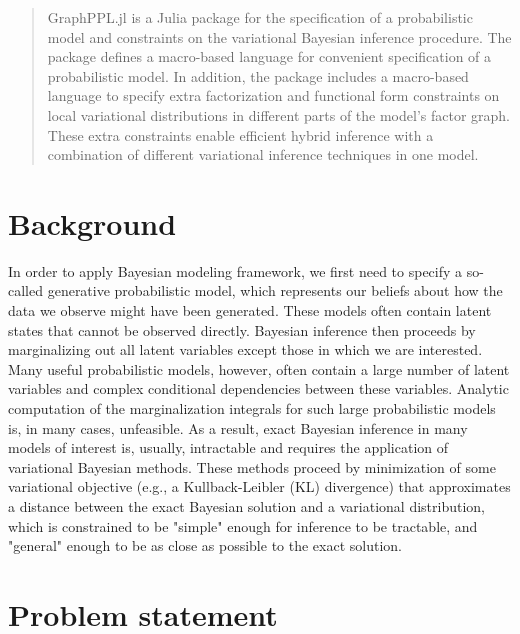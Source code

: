 \documentclass{juliacon}
\begin{document}


\maketitle

\begin{abstract}

GraphPPL.jl is a Julia package for the specification of a probabilistic model and constraints on the variational Bayesian inference procedure. 
The package defines a macro-based language for convenient specification of a probabilistic model. In addition, the package includes a macro-based language to specify extra factorization and functional form constraints on local variational distributions in different parts of the model's factor graph. These extra constraints enable efficient hybrid inference with a combination of different variational inference techniques in one model. 

\end{abstract}

\section{Background}

In order to apply Bayesian modeling framework, we first need to specify a so-called generative probabilistic model, which represents our beliefs about how the data we observe might have been generated. These models often contain latent states that cannot be observed directly. Bayesian inference then proceeds by marginalizing out all latent variables except those in which we are interested. Many useful probabilistic models, however, often contain a large number of latent variables and complex conditional dependencies between these variables. Analytic computation of the marginalization integrals for such large probabilistic models is, in many cases, unfeasible. As a result, exact Bayesian inference in many models of interest is, usually, intractable and requires the application of variational Bayesian methods. These methods proceed by minimization of some variational objective (e.g., a Kullback-Leibler (KL) divergence) that approximates a distance between the exact Bayesian solution and a variational distribution, which is constrained to be "simple" enough for inference to be tractable, and "general" enough to be as close as possible to the exact solution.

\section{Problem statement}
\end{document}
